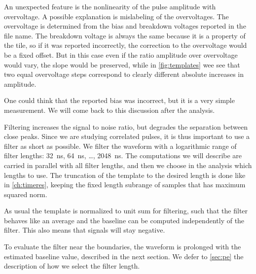 
\begin{figure}
    
    
    
\end{figure}

An unexpected feature is the nonlinearity of the pulse amplitude with
overvoltage. A possible explanation is mislabeling of the overvoltages. The
overvoltage is determined from the bias and breakdown voltages reported in the
file name. The breakdown voltage is always the same because it is a property of
the tile, so if it was reported incorrectly, the correction to the overvoltage
would be a fixed offset. But in this case even if the ratio amplitude over
overvoltage would vary, the slope would be preserved, while in
\autoref{fig:templates} wee see that two equal overvoltage steps correspond to
clearly different absolute increases in amplitude.

One could think that the reported bias was incorrect, but it is a very simple
measurement. We will come back to this discussion after the analysis.

Filtering increases the signal to noise ratio, but degrades the separation
between close peaks. Since we are studying correlated pulses, it is thus
important to use a filter as short as possible. We filter the waveform with a
logarithmic range of filter lengths: \SI{32}{ns}, \SI{64}{ns}, \ldots,
\SI{2048}{ns}. The computations we will describe are carried in parallel with
all filter lengths, and then we choose in the analysis which lengths to use.
The truncation of the template to the desired length is done like in
\autoref{ch:timeres}, keeping the fixed length subrange of samples that has
maximum squared norm.


As usual the template is normalized to unit sum for filtering, such that the
filter behaves like an average and the baseline can be computed independently
of the filter. This also means that signals will stay negative.

To evaluate the filter near the boundaries, the waveform is prolonged with the
estimated baseline value, described in the next section. We defer to
\autoref{sec:pe} the description of how we select the filter length.

